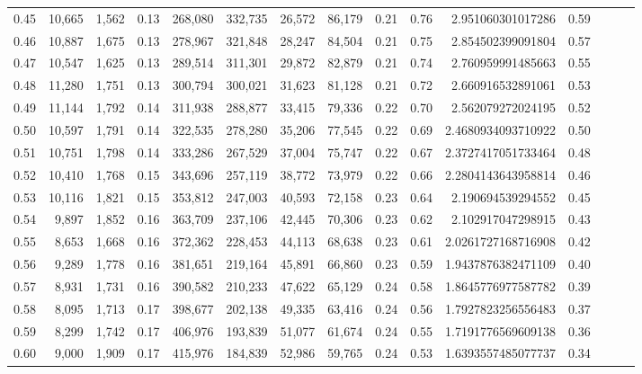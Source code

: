 \begin{tabular}{rrrrrrrrrrrrrrr}
0.45 &  10,665 &  1,562 &  0.13 &  268,080 &  332,735 &   26,572 &   86,179 &  0.21 &  0.76 &     2.951060301017286 &      0.59 \\
0.46 &  10,887 &  1,675 &  0.13 &  278,967 &  321,848 &   28,247 &   84,504 &  0.21 &  0.75 &     2.854502399091804 &      0.57 \\
0.47 &  10,547 &  1,625 &  0.13 &  289,514 &  311,301 &   29,872 &   82,879 &  0.21 &  0.74 &     2.760959991485663 &      0.55 \\
0.48 &  11,280 &  1,751 &  0.13 &  300,794 &  300,021 &   31,623 &   81,128 &  0.21 &  0.72 &     2.660916532891061 &      0.53 \\
0.49 &  11,144 &  1,792 &  0.14 &  311,938 &  288,877 &   33,415 &   79,336 &  0.22 &  0.70 &     2.562079272024195 &      0.52 \\
0.50 &  10,597 &  1,791 &  0.14 &  322,535 &  278,280 &   35,206 &   77,545 &  0.22 &  0.69 &    2.4680934093710922 &      0.50 \\
0.51 &  10,751 &  1,798 &  0.14 &  333,286 &  267,529 &   37,004 &   75,747 &  0.22 &  0.67 &    2.3727417051733464 &      0.48 \\
0.52 &  10,410 &  1,768 &  0.15 &  343,696 &  257,119 &   38,772 &   73,979 &  0.22 &  0.66 &    2.2804143643958814 &      0.46 \\
0.53 &  10,116 &  1,821 &  0.15 &  353,812 &  247,003 &   40,593 &   72,158 &  0.23 &  0.64 &     2.190694539294552 &      0.45 \\
0.54 &   9,897 &  1,852 &  0.16 &  363,709 &  237,106 &   42,445 &   70,306 &  0.23 &  0.62 &     2.102917047298915 &      0.43 \\
0.55 &   8,653 &  1,668 &  0.16 &  372,362 &  228,453 &   44,113 &   68,638 &  0.23 &  0.61 &    2.0261727168716908 &      0.42 \\
0.56 &   9,289 &  1,778 &  0.16 &  381,651 &  219,164 &   45,891 &   66,860 &  0.23 &  0.59 &    1.9437876382471109 &      0.40 \\
0.57 &   8,931 &  1,731 &  0.16 &  390,582 &  210,233 &   47,622 &   65,129 &  0.24 &  0.58 &    1.8645776977587782 &      0.39 \\
0.58 &   8,095 &  1,713 &  0.17 &  398,677 &  202,138 &   49,335 &   63,416 &  0.24 &  0.56 &    1.7927823256556483 &      0.37 \\
0.59 &   8,299 &  1,742 &  0.17 &  406,976 &  193,839 &   51,077 &   61,674 &  0.24 &  0.55 &    1.7191776569609138 &      0.36 \\
0.60 &   9,000 &  1,909 &  0.17 &  415,976 &  184,839 &   52,986 &   59,765 &  0.24 &  0.53 &    1.6393557485077737 &      0.34 \\

\end{tabular}
